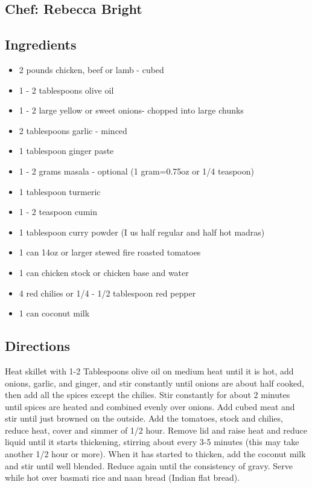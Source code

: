\documentclass[
]{book}
\providecommand{\tightlist}{%
  \setlength{\itemsep}{0pt}\setlength{\parskip}{0pt}}
\begin{document}
\hypertarget{chef-rebecca-bright-2}{%
\subsection*{Chef: Rebecca Bright}\label{chef-rebecca-bright-2}}


\hypertarget{ingredients-54}{%
\subsection*{Ingredients}\label{ingredients-54}}


\begin{itemize}
\tightlist
\item
  2 pounds chicken, beef or lamb - cubed
\item
  1 - 2 tablespoons olive oil
\item
  1 - 2 large yellow or sweet onions- chopped into large chunks
\item
  2 tablespoons garlic - minced
\item
  1 tablespoon ginger paste
\item
  1 - 2 grams masala - optional (1 gram=0.75oz or 1/4 teaspoon)
\item
  1 tablespoon turmeric
\item
  1 - 2 teaspoon cumin
\item
  1 tablespoon curry powder (I us half regular and half hot madras)
\item
  1 can 14oz or larger stewed fire roasted tomatoes
\item
  1 can chicken stock or chicken base and water
\item
  4 red chilies or 1/4 - 1/2 tablespoon red pepper
\item
  1 can coconut milk
\end{itemize}

\hypertarget{directions-54}{%
\subsection*{Directions}\label{directions-54}}


Heat skillet with 1-2 Tablespoons olive oil on medium heat until it is hot, add onions, garlic, and ginger,
and stir constantly until onions are about half cooked, then add all the spices except the chilies.
Stir constantly for about 2 minutes until spices are heated and combined evenly over onions.
Add cubed meat and stir until just browned on the outside. Add the tomatoes, stock and chilies, reduce heat,
cover and simmer of 1/2 hour. Remove lid and raise heat and reduce liquid until it starts thickening,
stirring about every 3-5 minutes (this may take another 1/2 hour or more). When it has started to thicken,
add the coconut milk and stir until well blended. Reduce again until the consistency of gravy.
Serve while hot over basmati rice and naan bread (Indian flat bread).
\end{document}
